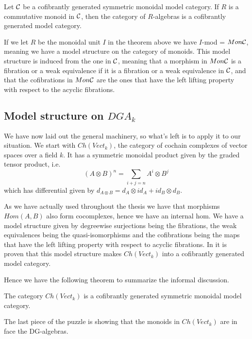 \begin{theorem}
Let $\mathcal{C}$ be a cofibrantly generated symmetric monoidal model category. If $R$ is a commutative monoid in $\mathcal{C}$, then the category of $R$-algebras is a cofibrantly generated model category. 
\end{theorem}

If we let $R$ be the monoidal unit $I$ in the theorem above we have $I$-mod = $Mon\mathcal{C}$, meaning we have a model structure on the category of monoids. This model structure is induced from the one in $\mathcal{C}$, meaning that a morphism in $Mon\mathcal{C}$ is a fibration or a weak equivalence if it is a fibration or a weak equivalence in $\mathcal{C}$, and that the cofibrations in $Mon\mathcal{C}$ are the ones that have the left lifting property with respect to the acyclic fibrations. 

\subsection*{Model structure on $DGA_k$}

We have now laid out the general machinery, so what's left is to apply it to our situation. We start with $Ch(Vect_k)$, the category of cochain complexes of vector spaces over a field $k$. It has a symmetric monoidal product given by the graded tensor product, i.e.
\begin{equation*}
    (A\otimes B)^n = \sum_{i+j=n} A^i \otimes B^j
\end{equation*}
which has differential given by $d_{A\otimes B} = d_A\otimes id_A + id_B\otimes d_B$. 

As we have actually used throughout the thesis we have that morphisms $Hom(A, B)$ also form cocomplexes, hence we have an internal hom. We have a model structure given by degreewise surjections being the fibrations, the weak equivalences being the quasi-isomorphisms and the cofibrations being the maps that have the left lifting property with respect to acyclic fibrations. In \cite[2.3.11]{hovey} it is proven that this model structure makes $Ch(Vect_k)$ into a cofibrantly generated model category. 

Hence we have the following theorem to summarize the informal discussion. 

\begin{theorem}
The category $Ch(Vect_k)$ is a cofibrantly generated symmetric monoidal model category.
\end{theorem}

The last piece of the puzzle is showing that the monoids in $Ch(Vect_k)$ are in face the DG-algebras. 

